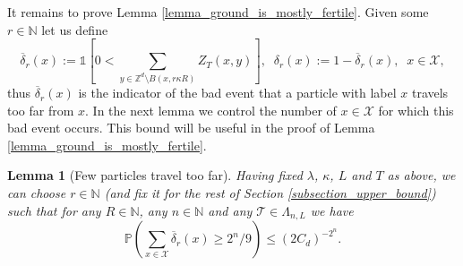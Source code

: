 \documentclass[a4paper,12pt]{article}
\newtheorem  {lemma}         [theorem]{Lemma}
\begin{document}
It remains to prove Lemma \ref{lemma_ground_is_mostly_fertile}. Given some $r \in \mathbb{N}$ let us define
\begin{equation}\label{delta_R_def_eq}
  \overline{\delta}_r(x):=\mathds{1} \left[ 0 < \sum_{y \in \mathbb{Z}^d \setminus B(x,r\kappa R)} Z_T(x,y)   \right], \; \;
  \delta_r(x):=1-\overline{\delta}_r(x), \; \;
   x \in \mathcal{X},
\end{equation}
thus  $\overline{\delta}_r(x)$ is the indicator of the bad event that a particle with label $x$ travels too far from $x$.
In the
 next lemma we control the number of $x \in \mathcal{X}$ for which this bad event occurs.
This bound will be useful in the proof of Lemma \ref{lemma_ground_is_mostly_fertile}.
\begin{lemma}[Few particles travel too far]\label{lemma_no_travel_far}
 Having fixed  $\lambda$, $\kappa$, $L$ and $T$ as above, we can choose $r \in \mathbb{N}$ (and fix it for the rest of Section \ref{subsection_upper_bound}) such that for
any $R \in \mathbb{N}$, any $n \in \mathbb{N}$ and any $\mathcal{T} \in \Lambda_{n,L}$ we have
\begin{equation}\label{no_travel_far_eq}
 \mathbb{P}\left( \sum_{x \in \mathcal{X} } \overline{\delta}_r(x) \geq  2^n /9 \right) \leq  \left( 2 C_d  \right)^{-2^n}.
\end{equation}
\end{lemma}
\end{document}
